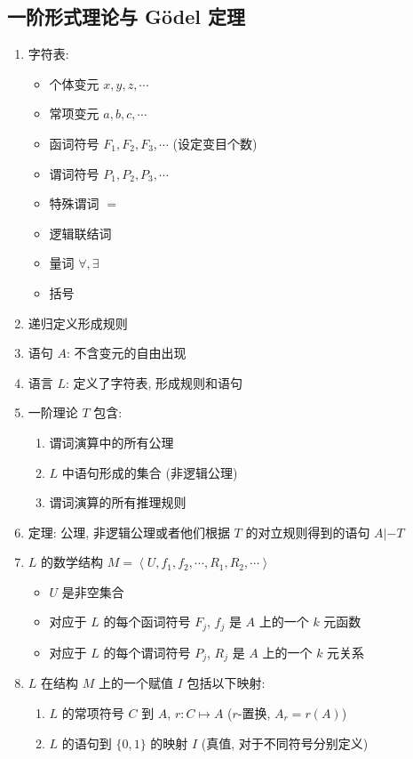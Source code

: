 \documentclass[11pt,a4paper,twocolumn,fleqn]{article} %
\begin{document}
\subsection{一阶形式理论与 G\"odel 定理} %
\label{sub:first_order_form}
\begin{enumerate}
	\item 字符表: 
	\begin{itemize}
		\item 个体变元 $x, y, z, \cdots$
		\item 常项变元 $a, b, c, \cdots$
		\item 函词符号 $F_1, F_2, F_3, \cdots$ (设定变目个数)
		\item 谓词符号 $P_1, P_2, P_3, \cdots$
		\item 特殊谓词 $=$
		\item 逻辑联结词
		\item 量词 $\forall, \exists$
		\item 括号
	\end{itemize}
	\item 递归定义形成规则
	\item 语句 $A$: 不含变元的自由出现
	\item 语言 $L$: 定义了字符表, 形成规则和语句
	\item 一阶理论 $T$ 包含: 
	\begin{enumerate}
		\item 谓词演算中的所有公理
		\item $L$ 中语句形成的集合 (非逻辑公理)
		\item 谓词演算的所有推理规则
	\end{enumerate}
	\item 定理: 公理, 非逻辑公理或者他们根据 $T$ 的对立规则得到的语句 $A|- T$
	\item $L$ 的数学结构 $M = \left\langle U, f_1, f_2, \cdots, R_1, R_2, \cdots
	\right\rangle$
	\begin{itemize}
		\item $U$ 是非空集合
		\item 对应于 $L$ 的每个函词符号 $F_j$, $f_j$ 是 $A$ 上的一个 $k$ 元函数
		\item 对应于 $L$ 的每个谓词符号 $P_j$, $R_j$ 是 $A$ 上的一个 $k$ 元关系
	\end{itemize}
	\item $L$ 在结构 $M$ 上的一个赋值 $I$ 包括以下映射:
	\begin{enumerate}
		\item $L$ 的常项符号 $C$ 到 $A$, $r: C\mapsto A$ ($r$-置换, $A_r = r(A)$)
		\item $L$ 的语句到 $\{0, 1\}$ 的映射 $I$ (真值, 对于不同符号分别定义)

\end{enumerate}
\end{enumerate}
\end{document}

